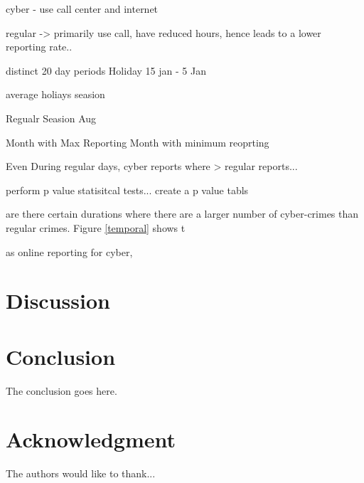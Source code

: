 \documentclass[conference]{IEEEtran}
\begin{document}
cyber - use call center and internet

regular -> primarily use call, have reduced hours, hence leads to a lower reporting rate..


distinct 20 day periods
Holiday 15 jan - 5 Jan


average holiays seasion


Regualr Seasion Aug

Month with Max Reporting
Month with minimum reoprting

Even During regular days, cyber reports where > regular reports... 

perform p value statisitcal tests...
create a p value tabls

are there certain durations where there are a larger number of cyber-crimes than regular crimes.  Figure \ref{temporal} shows t




as online reporting for cyber, 


\section{Discussion}


\section{Conclusion}
The conclusion goes here.



\section*{Acknowledgment}


The authors would like to thank...
\end{document}

